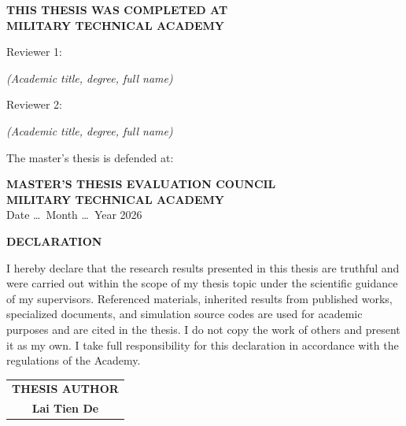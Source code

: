 \documentclass[a4paper,14pt]{extreport}
\newcommand{\academyName}{MILITARY TECHNICAL ACADEMY}
\begin{document}
\newpage
\thispagestyle{empty}
\begin{center}
  \vspace*{0.1cm}
  \textbf{THIS THESIS WAS COMPLETED AT}\\[0.25cm]
  \textbf{\academyName}\\[1.2cm]
\end{center}

\noindent Reviewer 1: \dotfill\\[-0.1cm]
\begin{center}
  \textit{(Academic title, degree, full name)}
\end{center}

\vspace{0.3cm}
\noindent Reviewer 2: \dotfill\\[-0.1cm]
\begin{center}
  \textit{(Academic title, degree, full name)}
\end{center}

\vspace{1.0cm}
\noindent The master's thesis is defended at:

\vspace{0.6cm}
\begin{center}
  \textbf{MASTER'S THESIS EVALUATION COUNCIL}\\
  \textbf{\academyName}\\[0.25cm]
  Date \ldots\ Month \ldots\ Year 2026
\end{center}

\newpage
{}
\setcounter{page}{1}

\begin{center}
  \textbf{DECLARATION}
\end{center}

I hereby declare that the research results presented in this thesis are truthful and were carried out within the scope of my thesis topic under the scientific guidance of my supervisors. Referenced materials, inherited results from published works, specialized documents, and simulation source codes are used for academic purposes and are cited in the thesis. I do not copy the work of others and present it as my own. I take full responsibility for this declaration in accordance with the regulations of the Academy.

\vspace{2.0cm}
\begin{flushright}
  \begin{tabular}{c}
    \textbf{THESIS AUTHOR}\\[2.0cm]
    \textbf{Lai Tien De}
  \end{tabular}
\end{flushright}
\end{document}
